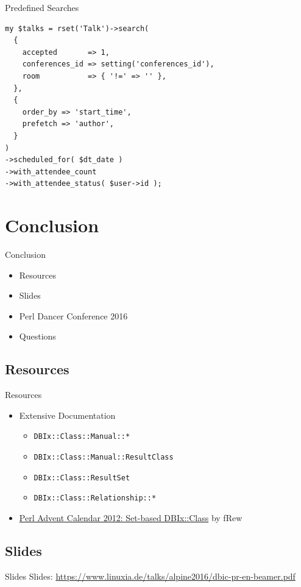 \begin{frame}[fragile]{Predefined Searches}
\begin{lstlisting}
my $talks = rset('Talk')->search(
  {
    accepted       => 1,
    conferences_id => setting('conferences_id'),
    room           => { '!=' => '' },
  },
  {
    order_by => 'start_time',
    prefetch => 'author',
  }
)
->scheduled_for( $dt_date )
->with_attendee_count
->with_attendee_status( $user->id );
\end{lstlisting}
\end{frame}

\section{Conclusion}

\begin{frame}{Conclusion}
\begin{itemize}
\item Resources
\item Slides
\item Perl Dancer Conference 2016
\item Questions
\end{itemize}
\end{frame}

\subsection{Resources}
\begin{frame}[fragile]{Resources}
\begin{itemize}
\item Extensive Documentation
\begin{itemize}
\item \verb|DBIx::Class::Manual::*|
\item \verb|DBIx::Class::Manual::ResultClass|
\item \verb|DBIx::Class::ResultSet|
\item \verb|DBIx::Class::Relationship::*|
\end{itemize}
\item \href{http://www.perladvent.org/2012/2012-12-21.html}
{Perl Advent Calendar 2012: Set-based DBIx::Class}
by fRew
\end{itemize}
\end{frame}

\subsection{Slides}
\begin{frame}{Slides}
Slides:
\url{https://www.linuxia.de/talks/alpine2016/dbic-pr-en-beamer.pdf}
\end{frame}

